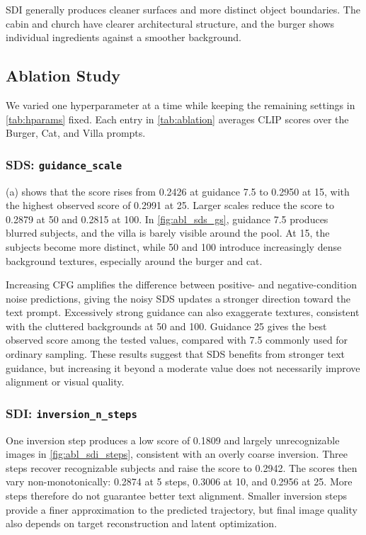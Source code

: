 SDI generally produces cleaner surfaces and more distinct object boundaries.
The cabin and church have clearer architectural structure, and the burger shows individual
ingredients against a smoother background.

\subsection{Ablation Study}
\label{sec:ablation}



We varied one hyperparameter at a time while keeping the remaining settings in
\cref{tab:hparams} fixed.
Each entry in \cref{tab:ablation} averages CLIP scores over the Burger, Cat, and Villa prompts.

\subsubsection{SDS: \texttt{guidance\_scale}}
\label{sec:abl_sds_gs}

(a) shows that the score rises from 0.2426 at guidance 7.5 to 0.2950 at 15,
with the highest observed score of 0.2991 at 25.
Larger scales reduce the score to 0.2879 at 50 and 0.2815 at 100.
In \cref{fig:abl_sds_gs}, guidance 7.5 produces blurred subjects, and the villa is barely visible
around the pool.
At 15, the subjects become more distinct, while 50 and 100 introduce increasingly dense background
textures, especially around the burger and cat.

Increasing CFG amplifies the difference between positive- and negative-condition noise predictions,
giving the noisy SDS updates a stronger direction toward the text prompt.
Excessively strong guidance can also exaggerate textures, consistent with the cluttered backgrounds
at 50 and 100.
Guidance 25 gives the best observed score among the tested values, compared with 7.5 commonly used
for ordinary sampling.
These results suggest that SDS benefits from stronger text guidance, but increasing it beyond a
moderate value does not necessarily improve alignment or visual quality.

\subsubsection{SDI: \texttt{inversion\_n\_steps}}
\label{sec:abl_sdi_steps}

One inversion step produces a low score of 0.1809 and largely unrecognizable images in
\cref{fig:abl_sdi_steps}, consistent with an overly coarse inversion.
Three steps recover recognizable subjects and raise the score to 0.2942.
The scores then vary non-monotonically: 0.2874 at 5 steps, 0.3006 at 10, and 0.2956 at 25.
More steps therefore do not guarantee better text alignment.
Smaller inversion steps provide a finer approximation to the predicted trajectory, but final image
quality also depends on target reconstruction and latent optimization.

